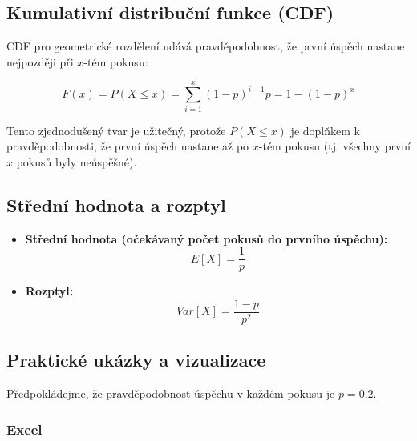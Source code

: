 \documentclass[
  czech,
  11pt,
  letterpaper,
  DIV=11,
  numbers=noendperiod]{scrreprt}
\providecommand{\tightlist}{%
  \setlength{\itemsep}{0pt}\setlength{\parskip}{0pt}}
\begin{document}
\subsection{Kumulativní distribuční funkce
(CDF)}\label{kumulativnuxed-distribuux10dnuxed-funkce-cdf-3}

CDF pro geometrické rozdělení udává pravděpodobnost, že první úspěch
nastane nejpozději při \(x\)-tém pokusu:

\[ F(x) = P(X \le x) = \sum_{i=1}^{x} (1-p)^{i-1} p = 1 - (1-p)^x \]

Tento zjednodušený tvar je užitečný, protože \(P(X \le x)\) je doplňkem
k pravděpodobnosti, že první úspěch nastane až po \(x\)-tém pokusu (tj.
všechny první \(x\) pokusů byly neúspěšné).

\subsection{Střední hodnota a
rozptyl}\label{stux159ednuxed-hodnota-a-rozptyl-2}

\begin{itemize}
\tightlist
\item
  \textbf{Střední hodnota (očekávaný počet pokusů do prvního úspěchu):}
  \[ E[X] = \frac{1}{p} \]
\item
  \textbf{Rozptyl:} \[ Var[X] = \frac{1-p}{p^2} \]
\end{itemize}

\subsection{Praktické ukázky a
vizualizace}\label{praktickuxe9-ukuxe1zky-a-vizualizace-2}

Předpokládejme, že pravděpodobnost úspěchu v každém pokusu je
\textbf{\(p=0.2\)}.

\subsubsection*{Excel}\label{excel-2}
\end{document}
